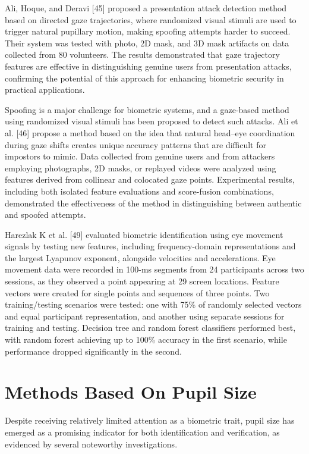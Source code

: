 \documentclass[12pt]{report}
\begin{document}
Ali, Hoque, and Deravi [45] proposed a presentation attack detection method based on directed gaze trajectories, where randomized visual stimuli are used to trigger natural pupillary motion, making spoofing attempts harder to succeed. 
Their system was tested with photo, 2D mask, and 3D mask artifacts on data collected from 80 volunteers.
The results demonstrated that gaze trajectory features are effective in distinguishing genuine users from presentation attacks, confirming the potential of this approach for enhancing biometric security in practical applications.

Spoofing is a major challenge for biometric systems, and a gaze-based method using randomized visual stimuli has been proposed to detect such attacks.
Ali et al. [46] propose a method based on the idea that natural head–eye coordination during gaze shifts creates unique accuracy patterns that are difficult for impostors to mimic.
Data collected from genuine users and from attackers employing photographs, 2D masks, or replayed videos were analyzed using features derived from collinear and colocated gaze points. 
Experimental results, including both isolated feature evaluations and score-fusion combinations, demonstrated the effectiveness of the method in distinguishing between authentic and spoofed attempts.

Harezlak K et al. [49] evaluated biometric identification using eye movement signals by testing new features, including frequency-domain representations and the largest Lyapunov exponent, alongside velocities and accelerations.
Eye movement data were recorded in 100-ms segments from 24 participants across two sessions, as they observed a point appearing at 29 screen locations. 
Feature vectors were created for single points and sequences of three points. 
Two training/testing scenarios were tested: one with 75\% of randomly selected vectors and equal participant representation, and another using separate sessions for training and testing.
Decision tree and random forest classifiers performed best, with random forest achieving up to 100\% accuracy in the first scenario, while performance dropped significantly in the second.

\section{Methods Based On Pupil Size}

Despite receiving relatively limited attention as a biometric trait, pupil size has emerged as a promising indicator for both identification and verification, as evidenced by several noteworthy investigations.
\end{document}
